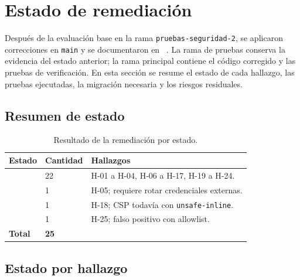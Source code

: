 \section{Estado de remediación}
\label{sec:estado-remediacion}

Después de la evaluación base en la rama \texttt{pruebas-seguridad-2}, se
aplicaron correcciones en \texttt{main} y se documentaron en
~\cite{remediacion}. La rama de pruebas conserva la
evidencia del estado anterior; la rama principal contiene el código corregido y
las pruebas de verificación. En esta sección se resume el estado de cada hallazgo,
las pruebas ejecutadas, la migración necesaria y los riesgos residuales.

\subsection{Resumen de estado}

\begin{table}[htbp]
\centering
\caption{Resultado de la remediación por estado.}
\label{tab:estado-resumen}
\begin{tabular}{@{}L{5.2cm}C{2.6cm}L{6.6cm}@{}}
\toprule
\textbf{Estado} & \textbf{Cantidad} & \textbf{Hallazgos}\\
\midrule
{} & 22 & H-01 a H-04, H-06 a H-17, H-19 a H-24.\\
 & 1 & H-05; requiere rotar credenciales externas.\\
 & 1 & H-18; CSP todavía con \texttt{unsafe-inline}.\\
 & 1 & H-25; falso positivo con allowlist.\\
\midrule
\textbf{Total} & \textbf{25} & \\
\bottomrule
\end{tabular}
\end{table}

\subsection{Estado por hallazgo}

